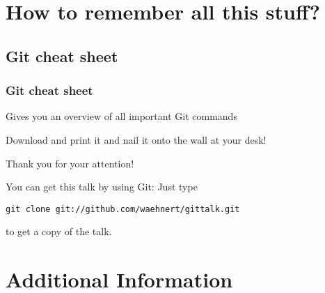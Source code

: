 \documentclass{beamer}
\begin{document}
\section{How to remember all this stuff?}
\subsection{Git cheat sheet}
\begin{frame}
  \frametitle{Git cheat sheet}
  Gives you an overview of all important Git commands
  \begin{center}
  \end{center}
  Download and print it and nail it onto the wall at your desk!
\end{frame}

\begin{frame}
  \begin{center}{}
    \begin{LARGE}
      Thank you for your attention!
    \end{LARGE}
  \end{center}\bigskip

You can get this talk by using Git: Just type\smallskip

\quad\texttt{git clone git://github.com/waehnert/gittalk.git}\smallskip

to get a copy of the talk.
\end{frame}

\section*{Additional Information}
\end{document}
